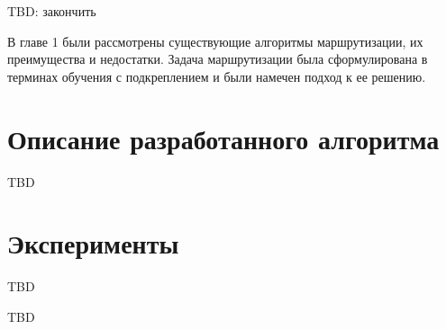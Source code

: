 \documentclass[]{itmo-student-thesis}
\begin{document}
TBD: закончить

\chapterconclusion

В главе 1 были рассмотрены существующие алгоритмы маршрутизации, их преимущества
и недостатки. Задача маршрутизации была сформулирована в терминах обучения с
подкреплением и были намечен подход к ее решению.

\chapter{Описание разработанного алгоритма}

TBD

\chapter{Эксперименты}

TBD

\startconclusionpage

TBD

\printmainbibliography
\end{document}
